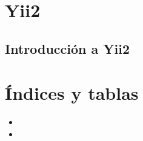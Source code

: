 \documentclass[a4paper,11pt,spanish]{sphinxmanual}
\begin{document}
\part{Yii2}
\label{\detokenize{contenidos:yii2}}

\chapter{Introducción a Yii2}
\label{\detokenize{contenidos:id119}}

\part{Índices y tablas}
\label{\detokenize{index:indices-y-tablas}}\begin{itemize}
\item {} 

\item {} 

\end{itemize}



\renewcommand{\indexname}{Índice}
\printindex
\end{document}
